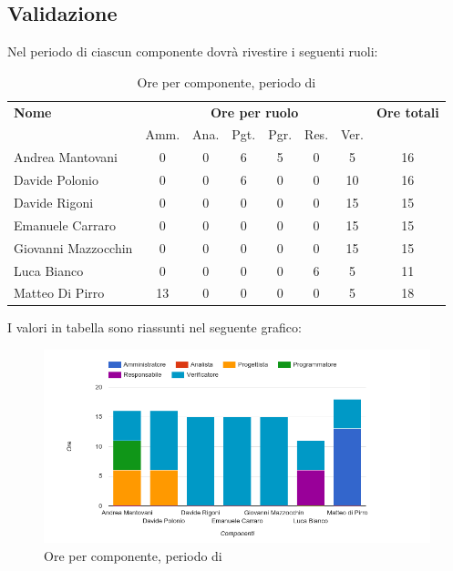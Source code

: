     
    
\pagebreak
\subsection{Validazione}
Nel periodo di  ciascun componente dovrà rivestire i seguenti ruoli:

\begin{table}[H]
\begin{tabular}{lccccccc}
\toprule
    \textbf{Nome}  & \multicolumn{6}{c}{\textbf{Ore per ruolo}} & \textbf{Ore totali} \\
     & Amm. & Ana. & Pgt. & Pgr. & Res. & Ver. & \\
    \midrule
    
	   Andrea Mantovani & 0 & 0 & 6 & 5 & 0 & 5 & 16 \\
	     Davide Polonio & 0 & 0 & 6 & 0 & 0 & 10 & 16 \\
	      Davide Rigoni & 0 & 0 & 0 & 0 & 0 & 15 & 15 \\
	   Emanuele Carraro & 0 & 0 & 0 & 0 & 0 & 15 & 15 \\
	Giovanni Mazzocchin & 0 & 0 & 0 & 0 & 0 & 15 & 15 \\
	        Luca Bianco & 0 & 0 & 0 & 0 & 6 & 5 & 11 \\
	    Matteo Di Pirro & 13 & 0 & 0 & 0 & 0 & 5 & 18 \\
    
    \bottomrule
\end{tabular}
\caption{Ore per componente, periodo di }
\end{table}

I valori in tabella sono riassunti nel seguente grafico: \\ 

    \begin{figure}[H]
      \begin{center}
        \includegraphics[width=15cm]{res/img/suddivisioneRuoloProspettoOrario/orePerComponenteValidazione.png}
      \caption{Ore per componente, periodo di }
      \end{center} 
    \end{figure}    
   
